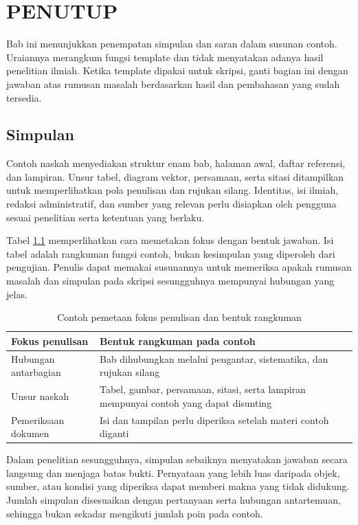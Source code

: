\chapter{PENUTUP}
\label{bab:penutup}

Bab ini menunjukkan penempatan simpulan dan saran dalam susunan contoh. Uraiannya merangkum fungsi template dan tidak menyatakan adanya hasil penelitian ilmiah. Ketika template dipakai untuk skripsi, ganti bagian ini dengan jawaban atas rumusan masalah berdasarkan hasil dan pembahasan yang sudah tersedia.

\section{Simpulan}

Contoh naskah menyediakan struktur enam bab, halaman awal, daftar referensi, dan lampiran. Unsur tabel, diagram vektor, persamaan, serta sitasi ditampilkan untuk memperlihatkan pola penulisan dan rujukan silang. Identitas, isi ilmiah, redaksi administratif, dan sumber yang relevan perlu disiapkan oleh pengguna sesuai penelitian serta ketentuan yang berlaku.

Tabel \ref{tab:contoh-rangkuman} memperlihatkan cara memetakan fokus dengan bentuk jawaban. Isi tabel adalah rangkuman fungsi contoh, bukan kesimpulan yang diperoleh dari pengujian. Penulis dapat memakai susunannya untuk memeriksa apakah rumusan masalah dan simpulan pada skripsi sesungguhnya mempunyai hubungan yang jelas.

\begin{table}[htbp]
  \centering
  \caption{Contoh pemetaan fokus penulisan dan bentuk rangkuman}
  \label{tab:contoh-rangkuman}
  \begin{tabular}{p{3.8cm}p{8.8cm}}
    \toprule
    Fokus penulisan & Bentuk rangkuman pada contoh \\
    \midrule
    Hubungan antarbagian & Bab dihubungkan melalui pengantar, sistematika, dan rujukan silang \\
    Unsur naskah & Tabel, gambar, persamaan, sitasi, serta lampiran mempunyai contoh yang dapat disunting \\
    Pemeriksaan dokumen & Isi dan tampilan perlu diperiksa setelah materi contoh diganti \\
    \bottomrule
  \end{tabular}
\end{table}

Dalam penelitian sesungguhnya, simpulan sebaiknya menyatakan jawaban secara langsung dan menjaga batas bukti. Pernyataan yang lebih luas daripada objek, sumber, atau kondisi yang diperiksa dapat memberi makna yang tidak didukung. Jumlah simpulan disesuaikan dengan pertanyaan serta hubungan antartemuan, sehingga bukan sekadar mengikuti jumlah poin pada contoh.

